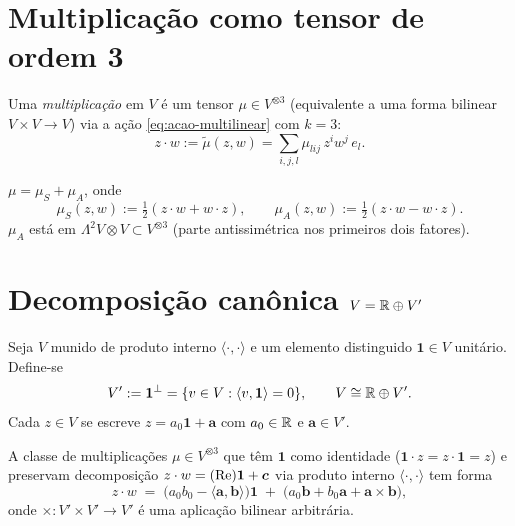 \documentclass[tensorial.tex]{subfiles}
\begin{document}
\section{Multiplicação como tensor de ordem 3}\label{sec:mult-tensor}

\begin{definicao}
Uma \emph{multiplicação} em $V$ é um tensor $\mu \in V^{\otimes 3}$
(equivalente a uma forma bilinear $V \times V \to V$) via a ação
\eqref{eq:acao-multilinear} com $k = 3$:
\[
  z \cdot w := \widetilde{\mu}(z, w) = \sum_{i, j, l} \mu_{l i j}\, z^i w^j\, e_l.
\]
\end{definicao}

\begin{proposicao}
$\mu = \mu_S + \mu_A$, onde
\[
  \mu_S(z, w) := \tfrac{1}{2}(z \cdot w + w \cdot z), \qquad
  \mu_A(z, w) := \tfrac{1}{2}(z \cdot w - w \cdot z).
\]
$\mu_A$ está em $\Lambda^2 V \otimes V \subset V^{\otimes 3}$ (parte
antissimétrica nos primeiros dois fatores).
\end{proposicao}

\section{Decomposição canônica $V = \mathbb{R} \oplus V'$}\label{sec:decomp}

\begin{definicao}
Seja $V$ munido de produto interno $\langle \cdot, \cdot\rangle$ e um
elemento distinguido $\mathbf{1} \in V$ unitário. Define-se
\[
  V' := \mathbf{1}^\perp = \{v \in V : \langle v, \mathbf{1}\rangle = 0\},
  \qquad V \cong \mathbb{R} \oplus V'.
\]
Cada $z \in V$ se escreve $z = a_0 \mathbf{1} + \boldsymbol{a}$ com
$a_0 \in \mathbb{R}$ e $\boldsymbol{a} \in V'$.
\end{definicao}

\begin{teorema}\label{thm:forma-canon}
A classe de multiplicações $\mu \in V^{\otimes 3}$ que têm $\mathbf{1}$
como identidade ($\mathbf{1} \cdot z = z \cdot \mathbf{1} = z$) e
preservam decomposição
$z \cdot w = (\operatorname{Re}) \mathbf{1} + \boldsymbol{c}$ via produto interno
$\langle \cdot, \cdot\rangle$ tem forma
\begin{equation}\label{eq:mult-canon}
  z \cdot w \;=\; \bigl(a_0 b_0 - \langle \boldsymbol{a}, \boldsymbol{b}\rangle\bigr) \mathbf{1}
              \;+\; \bigl(a_0 \boldsymbol{b} + b_0 \boldsymbol{a} + \boldsymbol{a} \times \boldsymbol{b}\bigr),
\end{equation}
onde $\times : V' \times V' \to V'$ é uma aplicação bilinear arbitrária.
\end{teorema}
\end{document}
